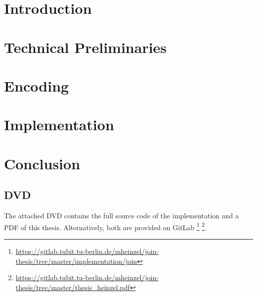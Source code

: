 \documentclass[a4paper,12pt,titlepage,twoside,BCOR=6mm,abstracton]{scrreprt}
\begin{document}



\cleardoublepage

\thispagestyle{empty}

\cleardoublepage



\cleardoublepage


\cleardoublepage
\tableofcontents
\cleardoublepage



\chapter{Introduction}


\chapter{Technical Preliminaries}



\chapter{Encoding}


\chapter{Implementation}






\chapter{Conclusion}





\begin{appendices}
  \chapter{DVD}
  The attached DVD contains the full source code of the implementation
  and a PDF of this thesis.
  Alternatively, both are provided on GitLab
  \footnote{\url{https://gitlab.tubit.tu-berlin.de/mheinzel/join-thesis/tree/master/implementation/join}}
  \footnote{\url{https://gitlab.tubit.tu-berlin.de/mheinzel/join-thesis/tree/master/thesis_heinzel.pdf}}.
\end{appendices}
\end{document}
